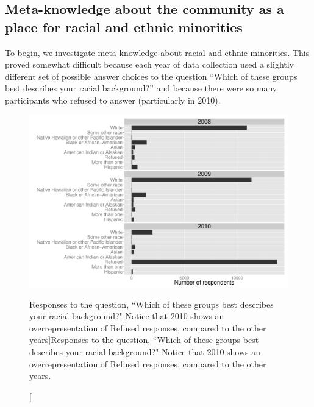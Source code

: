 \documentclass[smallextended]{svjour3}\usepackage[]{graphicx}\usepackage[]{color}
\newenvironment{knitrout}{}{} %
\begin{document}
\subsection{Meta-knowledge about the community as a place for racial and ethnic minorities}
\label{minorities}
To begin, we investigate meta-knowledge about racial and ethnic minorities. This proved somewhat difficult because each year of data collection used a slightly different set of possible answer choices to the question ``Which of these groups best describes your racial background?'' and because there were so many participants who refused to answer (particularly in 2010). 



\begin{knitrout}
\color{fgcolor}\begin{figure}

{\centering \includegraphics[width=0.99\linewidth]{figure/overallRaceplot-1} 

}

\caption[Responses to the question, ``Which of these groups best describes your racial background?" Notice that 2010 shows an overrepresentation of Refused responses, compared to the other years]{Responses to the question, ``Which of these groups best describes your racial background?" Notice that 2010 shows an overrepresentation of Refused responses, compared to the other years.}\label{fig:overallRaceplot}
\end{figure}


\end{knitrout}
\end{document}
